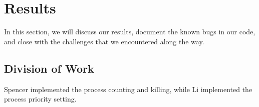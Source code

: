 \documentclass{article}
\begin{document}



\section{Results}

In this section, we will discuss our results, document the known bugs in our 
code, and close with the challenges that we encountered along the way. \\ 

\subsection{Division of Work}
Spencer implemented the process counting and killing, while Li implemented the
process priority setting. \\
\end{document}
